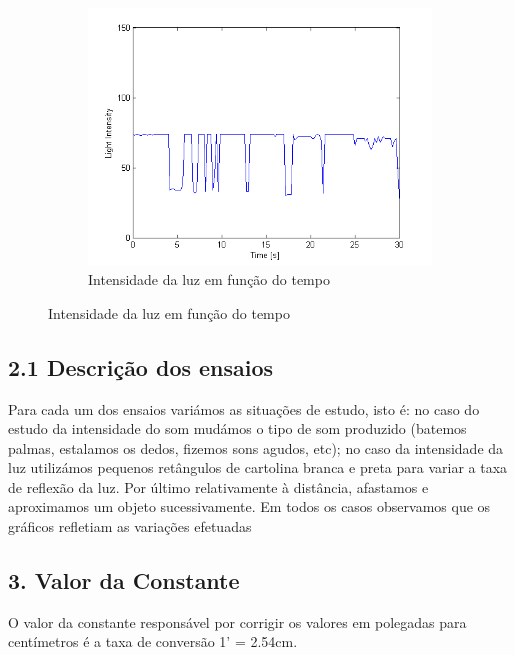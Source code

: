\documentclass{article}
\begin{document}
\begin{figure}[H]
    \begin{subfigure}{.5\textwidth}
        \includegraphics[scale=.5]{light}
        \caption{Intensidade da luz em função do tempo}
    \end{subfigure}
\end{figure}
\subsection*{2.1 Descrição dos ensaios}
Para cada um dos ensaios variámos as situações de estudo, isto é: no caso do estudo da
intensidade do som mudámos o tipo de som produzido (batemos palmas, estalamos os dedos,
fizemos sons agudos, etc); no caso da intensidade da luz utilizámos pequenos retângulos de
cartolina branca e preta para variar a taxa de reflexão da luz. Por último relativamente à
distância, afastamos e aproximamos um objeto sucessivamente. Em todos os casos observamos que os
gráficos refletiam as variações efetuadas
\subsection*{3. Valor da Constante}
O valor da constante responsável por corrigir os valores em polegadas para centímetros é a taxa
de conversão 1' = 2.54cm.
\end{document}
